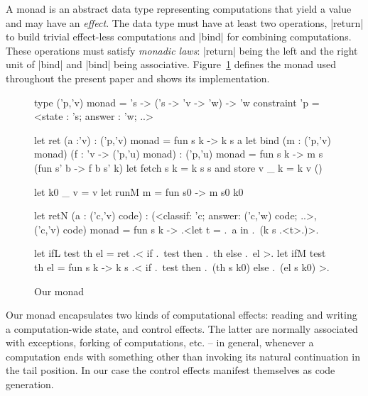 \documentclass{elsart}
\begin{document}
A monad \cite{moggi-notions} is an abstract data type representing
computations that yield a value and may have an \emph{effect}.
The data type must have at least two operations, |return| to build
trivial effect-less computations and |bind| for combining
computations. These operations must satisfy \emph{monadic laws}:
|return| being the left and the right unit of |bind| and |bind| being
associative. Figure~\ref{ourmonad} defines the monad used throughout
the present paper and shows its implementation.

\begin{figure}
\begin{code}
type ('p,'v) monad = 's -> ('s -> 'v -> 'w) -> 'w
    constraint 'p = <state : 's; answer : 'w; ..>

let ret (a :'v) : ('p,'v) monad = fun s k -> k s a
let bind (m : ('p,'v) monad) (f : 'v -> ('p,'u) monad) : ('p,'u) monad
  = fun s k -> m s (fun s' b -> f b s' k)
let fetch s k = k s s  and  store v _ k = k v ()

let k0 _ v = v
let runM m = fun s0 -> m s0 k0 

let retN (a : ('c,'v) code) : 
 (<classif: 'c; answer: ('c,'w) code; ..>,('c,'v) code) monad 
   = fun s k -> .<let t = .~a in .~(k s .<t>.)>.

let ifL test th el = ret .< if .~test then .~th else .~el >.
let ifM test th el = fun s k -> 
  k s .< if .~test then .~(th s k0) else .~(el s k0) >.
\end{code}
\caption{Our monad}\label{ourmonad}
\end{figure}

Our monad encapsulates two kinds of computational effects: reading and
writing a computation-wide state, and control effects. The latter are
normally associated with exceptions, forking of computations, etc. --
in general, whenever a computation ends with something other than
invoking its natural continuation in the tail position. In our case
the control effects manifest themselves as code generation.
\end{document}
